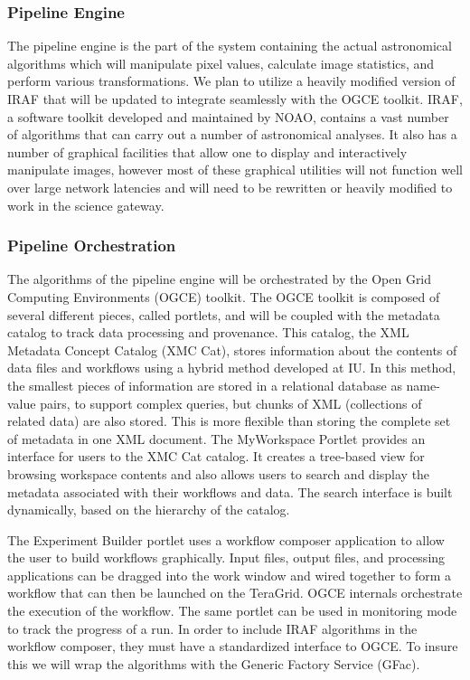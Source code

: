 \documentclass[10pt,conference]{IEEEtran}
\begin{document}
\subsubsection{Pipeline Engine}

The pipeline engine is the part of the system containing the actual astronomical algorithms which will manipulate pixel values, calculate image statistics, and perform various transformations. We plan to utilize a heavily modified version of IRAF that will be updated to integrate seamlessly with the OGCE toolkit. IRAF, a software toolkit developed and maintained by NOAO, contains a vast number of algorithms that can carry out a number of astronomical analyses. It also has a number of graphical facilities that allow one to display and interactively manipulate images, however most of these graphical utilities will not function well over large network latencies and will need to be rewritten or heavily modified to work in the science gateway. 

\subsubsection{Pipeline Orchestration}

The algorithms of the pipeline engine will be orchestrated by the Open Grid Computing Environments (OGCE) toolkit. The OGCE toolkit is composed of several different pieces, called portlets, and will be coupled with the metadata catalog to track data processing and provenance. This catalog, the XML Metadata Concept Catalog (XMC Cat)\cite{jensen2008}, stores information about the contents of data files and workflows using a hybrid method developed at IU. In this method, the smallest pieces of information are stored in a relational database as name-value pairs, to support complex queries, but chunks of XML (collections of related data) are also stored. This is more flexible than storing the complete set of metadata in one XML document. The MyWorkspace Portlet provides an interface for users to the XMC Cat catalog. It creates a tree-based view for browsing workspace contents and also allows users to search and display the metadata associated with their workflows and data. The search interface is built dynamically, based on the hierarchy of the catalog. 

The Experiment Builder portlet uses a workflow composer application to allow the user to build workflows graphically. Input files, output files, and processing applications can be dragged into the work window and wired together to form a workflow that can then be launched on the TeraGrid. OGCE internals orchestrate the execution of the workflow. The same portlet can be used in monitoring mode to track the progress of a run. In order to include IRAF algorithms in the workflow composer, they must have a standardized interface to OGCE. To insure this we will wrap the algorithms with the Generic Factory Service (GFac).
 
\end{document}

